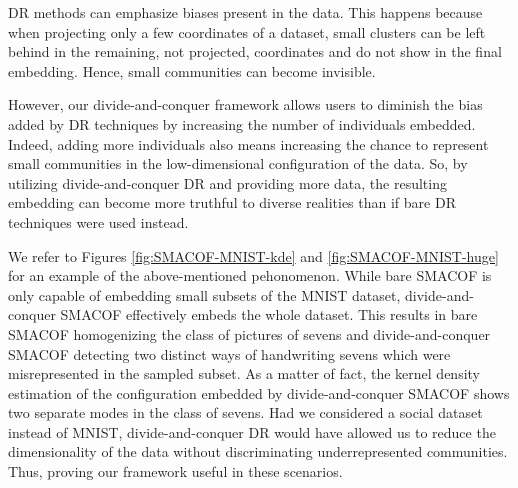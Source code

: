 DR methods can emphasize biases present in the data. This happens because when projecting only a few coordinates of a dataset, small clusters can be left behind in the remaining, not projected, coordinates and do not show in the final embedding. Hence, small communities can become invisible.

However, our divide-and-conquer framework allows users to diminish the bias added by DR techniques by increasing the number of individuals embedded. Indeed, adding more individuals also means increasing the chance to represent small communities in the low-dimensional configuration of the data. So, by utilizing divide-and-conquer DR and providing more data, the resulting embedding can become more truthful to diverse realities than if bare DR techniques were used instead.

We refer to Figures \ref{fig:SMACOF-MNIST-kde} and \ref{fig:SMACOF-MNIST-huge} for an example of the above-mentioned pehonomenon. While bare SMACOF is only capable of embedding small subsets of the MNIST dataset, divide-and-conquer SMACOF effectively embeds the whole dataset. This results in bare SMACOF homogenizing the class of pictures of sevens and divide-and-conquer SMACOF detecting two distinct ways of handwriting sevens which were misrepresented in the sampled subset. As a matter of fact, the kernel density estimation of the configuration embedded by divide-and-conquer SMACOF shows two separate modes in the class of sevens. Had we considered a social dataset instead of MNIST, divide-and-conquer DR would have allowed us to reduce the dimensionality of the data without discriminating underrepresented communities. Thus, proving our framework useful in these scenarios.